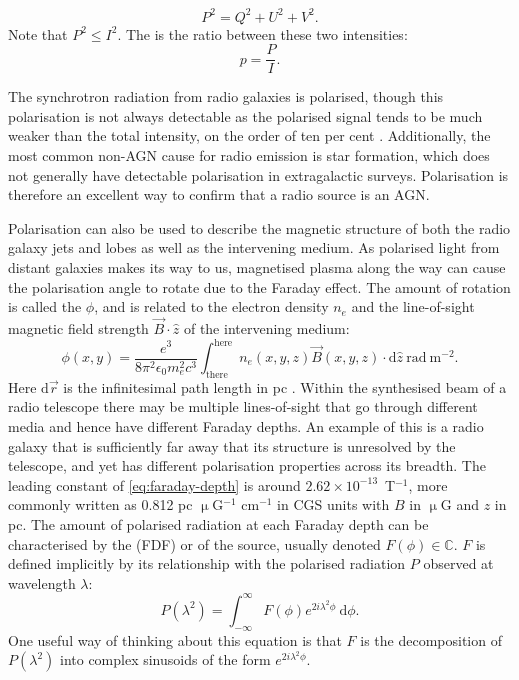         \begin{equation}
            \label{eq:polarised-intensity}
            P^2 = Q^2 + U^2 + V^2.
        \end{equation}
        Note that $P^2 \leq I^2$. The  is the ratio between these two intensities:
        \begin{equation}
            p = \frac{P}{I}.
        \end{equation}

        The synchrotron radiation from radio galaxies is polarised, though this polarisation is not always detectable as the polarised signal tends to be much weaker than the total intensity, on the order of ten per cent \citep{osullivan_magnetic_2015}. Additionally, the most common non-AGN cause for radio emission is star formation, which does not generally have detectable polarisation in extragalactic surveys. Polarisation is therefore an excellent way to confirm that a radio source is an AGN.

        Polarisation can also be used to describe the magnetic structure of both the radio galaxy jets and lobes as well as the intervening medium. As polarised light from distant galaxies makes its way to us, magnetised plasma along the way can cause the polarisation angle to rotate due to the Faraday effect. The amount of rotation is called the  $\phi$, and is related to the electron density $n_e$ and the line-of-sight magnetic field strength $\vec B \cdot \hat{z}$ of the intervening medium:
        \begin{equation}
            \label{eq:faraday-depth}
            \phi(x, y) = \frac{e^3}{8\pi^2\epsilon_0m_e^2c^3} \int_{\mathrm{there}}^{\mathrm{here}} n_e(x, y, z) \vec B(x, y, z) \cdot \mathrm{d}\hat{z}\ \mathrm{rad}\ \mathrm{m}^{-2}.
        \end{equation}
        Here $\mathrm{d}\vec r$ is the infinitesimal path length in pc \citep{brentjens_faraday_2005}. Within the synthesised beam of a radio telescope there may be multiple lines-of-sight that go through different media and hence have different Faraday depths. An example of this is a radio galaxy that is sufficiently far away that its structure is unresolved by the telescope, and yet has different polarisation properties across its breadth. The leading constant of \autoref{eq:faraday-depth} is around $2.62 \times 10^{-13}$~T$^{-1}$, more commonly written as 0.812 pc $\upmu$G$^{-1}$ cm$^{-1}$ in CGS units with $B$ in $\upmu$G and $z$ in pc. The amount of polarised radiation at each Faraday depth can be characterised by the  (FDF) or  of the source, usually denoted $F(\phi) \in \mathbb C$. $F$ is defined implicitly by its relationship with the polarised radiation $P$ observed at wavelength $\lambda$:
        \begin{equation}
            \label{eq:faraday-dispersion-function}
            P(\lambda^2) = \int_{-\infty}^\infty F(\phi) e^{2i\lambda^2\phi}\ \mathrm{d}\phi.
        \end{equation}
        One useful way of thinking about this equation is that $F$ is the decomposition of $P(\lambda^2)$ into complex sinusoids of the form $e^{2i\lambda^2\phi}$.

